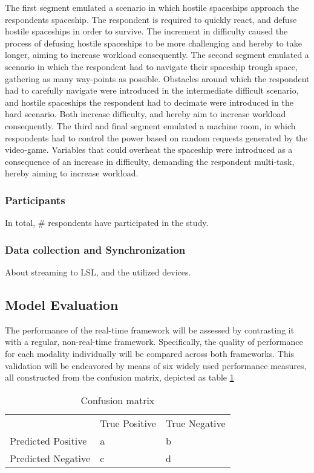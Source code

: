 \documentclass{article}
\begin{document}
The first segment emulated a scenario in which hostile spaceships approach the respondents spaceship. The respondent is required to  quickly react, and defuse hostile spaceships in order to survive. The increment in difficulty caused the process of defusing hostile spaceships to be more challenging and hereby to take longer,  aiming to increase workload consequently. The second segment emulated a scenario in which the respondent had to navigate their spaceship trough space, gathering as many way-points as possible. Obstacles around which the respondent had to carefully navigate were introduced in the intermediate difficult scenario, and hostile spaceships the respondent had to decimate were introduced in the hard scenario. Both increase difficulty, and hereby aim to increase workload consequently. The third and final segment emulated a machine room, in which respondents had to control the power based on random requests generated by the video-game. Variables that could overheat the spaceship  were introduced as a consequence of an increase in difficulty, demanding the respondent multi-task, hereby aiming to increase workload. 

\subsubsection{Participants}
In total, \# respondents have participated in the study. 

\subsubsection{Data collection and Synchronization}
About streaming to LSL, and the utilized devices. 

\subsection{Model Evaluation}
The performance of the real-time framework will be assessed by contrasting it with a regular, non-real-time framework. Specifically, the quality of performance for each modality individually will be compared across both frameworks. This validation will be endeavored by means of six widely used performance measures, all constructed from the confusion matrix, depicted as table  \ref{table:confusion}  
\bigskip
\bgroup
\def\arraystretch{1.6}%
\begin{table}[h]
\centering
\caption{Confusion matrix}
\label{table:confusion}
\begin{tabular}{lll}
                                        & True Positive          & True Negative          \\ \cline{2-3} 
\multicolumn{1}{l|}{Predicted Positive} & \multicolumn{1}{l|}{a} & \multicolumn{1}{l|}{b} \\ \cline{2-3} 
\multicolumn{1}{l|}{Predicted Negative} & \multicolumn{1}{l|}{c} & \multicolumn{1}{l|}{d} \\ \cline{2-3} 
\end{tabular}
\end{table}
\egroup
\end{document}
